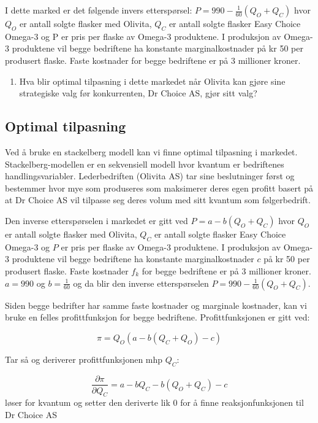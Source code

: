 \documentclass[
  12pt,
  a4paper,
  DIV=11,
  numbers=noendperiod]{scrartcl}
\providecommand{\tightlist}{%
  \setlength{\itemsep}{0pt}\setlength{\parskip}{0pt}}\usepackage{longtable,booktabs,array}
\begin{document}
I dette marked er det følgende invers etterspørsel:
\(P = 990−\frac{1}{60}(Q_O+Q_C)\) hvor \(Q_O\) er antall solgte flasker
med Olivita, \(Q_C\) er antall solgte flasker Easy Choice Omega-3 og P
er pris per flaske av Omega-3 produktene. I produksjon av Omega-3
produktene vil begge bedriftene ha konstante marginalkostnader på kr 50
per produsert flaske. Faste kostnader for begge bedriftene er på 3
millioner kroner.

\begin{enumerate}
\def\labelenumi{\alph{enumi})}
\tightlist
\item
  Hva blir optimal tilpasning i dette markedet når Olivita kan gjøre
  sine strategiske valg før konkurrenten, Dr Choice AS, gjør sitt valg?
\end{enumerate}

\subsection{Optimal tilpasning}\label{optimal-tilpasning}

Ved å bruke en stackelberg modell kan vi finne optimal tilpasning i
markedet. Stackelberg-modellen er en sekvensiell modell hvor kvantum er
bedriftenes handlingsvariabler. Lederbedriften (Olivita AS) tar sine
beslutninger først og bestemmer hvor mye som produseres som maksimerer
deres egen profitt basert på at Dr Choice AS vil tilpasse seg deres
volum med sitt kvantum som følgerbedrift.

Den inverse etterspørselen i markedet er gitt ved \(P = a−b(Q_O+Q_C)\)
hvor \(Q_O\) er antall solgte flasker med Olivita, \(Q_C\) er antall
solgte flasker Easy Choice Omega-3 og \(P\) er pris per flaske av
Omega-3 produktene. I produksjon av Omega-3 produktene vil begge
bedriftene ha konstante marginalkostnader \(c\) på kr 50 per produsert
flaske. Faste kostnader \(f_k\) for begge bedriftene er på 3 millioner
kroner. \(a = 990\) og \(b = \frac{1}{60}\) og da blir den inverse
etterspørselen \(P = 990−\frac{1}{60}(Q_O+Q_C)\).

Siden begge bedrifter har samme faste kostnader og marginale kostnader,
kan vi bruke en felles profittfunksjon for begge bedriftene.
Profittfunksjonen er gitt ved:

\[\pi = Q_O(a-b(Q_C+Q_O)-c) \tag{1}\]

Tar så og deriverer profittfunksjonen mhp \(Q_C\):

\[\frac{\partial \pi}{\partial Q_C} = a -b Q_C - b(Q_O+Q_C) -c \tag{2}\]
løser for kvantum og setter den deriverte lik 0 for å finne
reaksjonfunksjonen til Dr Choice AS
\end{document}
